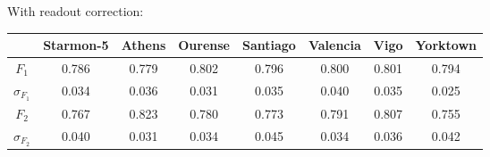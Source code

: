 With readout correction:
\begin{table}[H]
    \centering
    \begin{tabular}{|c|c|c|c|c|c|c|c|}
    \hline
    \textbf{} & \textbf{Starmon-5} & \textbf{Athens} & \textbf{Ourense} & \textbf{Santiago} & \textbf{Valencia} & \textbf{Vigo} & \textbf{Yorktown} \\ \hline
    $F_1$              & 0.786 & 0.779 & 0.802 & 0.796 & 0.800 & 0.801 & 0.794 \\ \hline
    $\sigma_{F_1}$     & 0.034 & 0.036 & 0.031 & 0.035 & 0.040 & 0.035 & 0.025 \\ \hline
    $F_2$              & 0.767 & 0.823 & 0.780 & 0.773 & 0.791 & 0.807 & 0.755 \\ \hline
    $\sigma_{F_2}$     & 0.040 & 0.031 & 0.034 & 0.045 & 0.034 & 0.036 & 0.042 \\ \hline
    \end{tabular}
\end{table}


